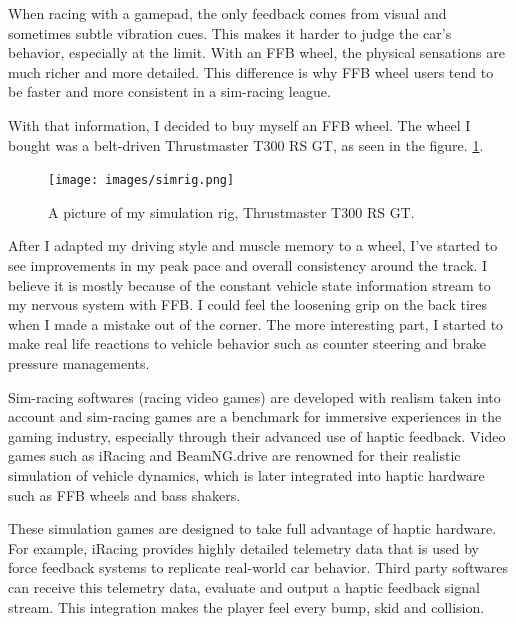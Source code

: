                 When racing with a gamepad, the only feedback comes from visual and sometimes subtle vibration cues. This makes it harder to judge the car's behavior, especially at the limit. With an FFB wheel, the physical sensations are much richer and more detailed. This difference is why FFB wheel users tend to be faster and more consistent in a sim-racing league.\par

                With that information, I decided to buy myself an FFB wheel. The wheel I bought was a belt-driven Thrustmaster T300 RS GT, as seen in the figure. \ref{fig:SIMRIG}.\par 

                \begin{figure}[H]
                    \centering
                    \texttt{[image: images/simrig.png]}
                    \caption{A picture of my simulation rig, Thrustmaster T300 RS GT.}
                    \label{fig:SIMRIG}
                \end{figure}

                After I adapted my driving style and muscle memory to a wheel, I've started to see improvements in my peak pace and overall consistency around the track. I believe it is mostly because of the constant vehicle state information stream to my nervous system with FFB. I could feel the loosening grip on the back tires when I made a mistake out of the corner. The more interesting part, I started to make real life reactions to vehicle behavior such as counter steering and brake pressure managements.

                Sim-racing softwares (racing video games) are developed with realism taken into account and sim-racing games are a benchmark for immersive experiences in the gaming industry, especially through their advanced use of haptic feedback. Video games such as iRacing and BeamNG.drive are renowned for their realistic simulation of vehicle dynamics, which is later integrated into haptic hardware such as FFB wheels and bass shakers.\par

                These simulation games are designed to take full advantage of haptic hardware. For example, iRacing provides highly detailed telemetry data that is used by force feedback systems to replicate real-world car behavior. Third party softwares can receive this telemetry data, evaluate and output a haptic feedback signal stream. This integration makes the player feel every bump, skid and collision.\par

